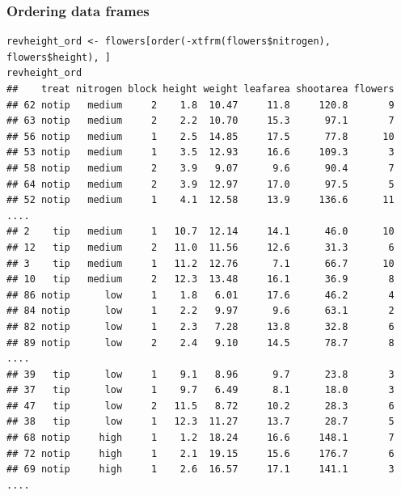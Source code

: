 \documentclass{beamer}
\newcommand{\lsting}[1]{\begin{lstlisting}[basicstyle=#1]}
\newcommand{\bfr}[1]{\begin{frame}[fragile]\frametitle{{ #1 }}}
\begin{document}
\bfr{Ordering data frames}
\lsting{\tiny}
revheight_ord <- flowers[order(-xtfrm(flowers$nitrogen), flowers$height), ]        
revheight_ord
##    treat nitrogen block height weight leafarea shootarea flowers
## 62 notip   medium     2    1.8  10.47     11.8     120.8       9
## 63 notip   medium     2    2.2  10.70     15.3      97.1       7
## 56 notip   medium     1    2.5  14.85     17.5      77.8      10
## 53 notip   medium     1    3.5  12.93     16.6     109.3       3
## 58 notip   medium     2    3.9   9.07      9.6      90.4       7
## 64 notip   medium     2    3.9  12.97     17.0      97.5       5
## 52 notip   medium     1    4.1  12.58     13.9     136.6      11
....
## 2    tip   medium     1   10.7  12.14     14.1      46.0      10
## 12   tip   medium     2   11.0  11.56     12.6      31.3       6
## 3    tip   medium     1   11.2  12.76      7.1      66.7      10
## 10   tip   medium     2   12.3  13.48     16.1      36.9       8
## 86 notip      low     1    1.8   6.01     17.6      46.2       4
## 84 notip      low     1    2.2   9.97      9.6      63.1       2
## 82 notip      low     1    2.3   7.28     13.8      32.8       6
## 89 notip      low     2    2.4   9.10     14.5      78.7       8
....
## 39   tip      low     1    9.1   8.96      9.7      23.8       3
## 37   tip      low     1    9.7   6.49      8.1      18.0       3
## 47   tip      low     2   11.5   8.72     10.2      28.3       6
## 38   tip      low     1   12.3  11.27     13.7      28.7       5
## 68 notip     high     1    1.2  18.24     16.6     148.1       7
## 72 notip     high     1    2.1  19.15     15.6     176.7       6
## 69 notip     high     1    2.6  16.57     17.1     141.1       3
....
\end{lstlisting}
\end{frame}
\end{document}

